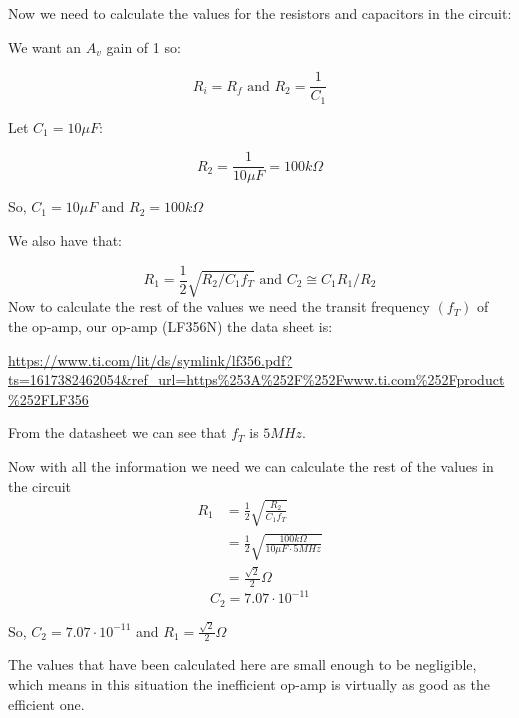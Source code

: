 \documentclass{article}
\begin{document}
Now we need to calculate the values for the resistors and capacitors in the circuit:
\begin{center}
    We want an $A_v$ gain of 1 so:
\end{center}
\begin{equation}
    R_i = R_f\text{ and }R_2 = \frac{1}{C_1}
\end{equation}
\begin{center}
    Let $C_1 = 10\mu F$:
\end{center}
\begin{equation}
    R_2 = \frac{1}{10\mu F} = 100k\Omega
\end{equation}
\begin{center}
    So, $\boxed{C_1 = 10\mu F}$ and $\boxed{R_2 = 100k\Omega}$
\end{center}
\begin{center}
    We also have that:
\end{center}
\begin{equation}
    R_1 = \frac{1}{2}\sqrt{R_2/C_1f_T}\text{ and }C_2 \cong C_1R_1/R_2
\end{equation}
Now to calculate the rest of the values we need the transit frequency $(f_T)$ of the op-amp, our op-amp (LF356N) the data sheet is:

\url{https://www.ti.com/lit/ds/symlink/lf356.pdf?ts=1617382462054&ref_url=https%253A%252F%252Fwww.ti.com%252Fproduct%252FLF356}

\begin{center}
\end{center}
From the datasheet we can see that  $f_T$ is $5MHz$.

Now with all the information we need we can calculate the rest of the values in the circuit
\begin{align}
    R_1 &= \frac{1}{2}\sqrt{\frac{R_2}{C_1f_T}} \\
    &= \frac{1}{2}\sqrt{\frac{100k\Omega}{10\mu F\cdot 5MHz}}\\
    &= \frac{\sqrt{2}}{2}\Omega
\end{align}
\begin{equation}
    C_2 = 7.07\cdot 10^{-11}
\end{equation}
\begin{center}
    So, $\boxed{C_2 = 7.07\cdot 10^{-11}}$ and $\boxed{R_1 = \frac{\sqrt{2}}{2}\Omega}$
\end{center}
The values that have been calculated here are small enough to be negligible, which means in this situation the inefficient op-amp is virtually as good as the efficient one.
\end{document}
